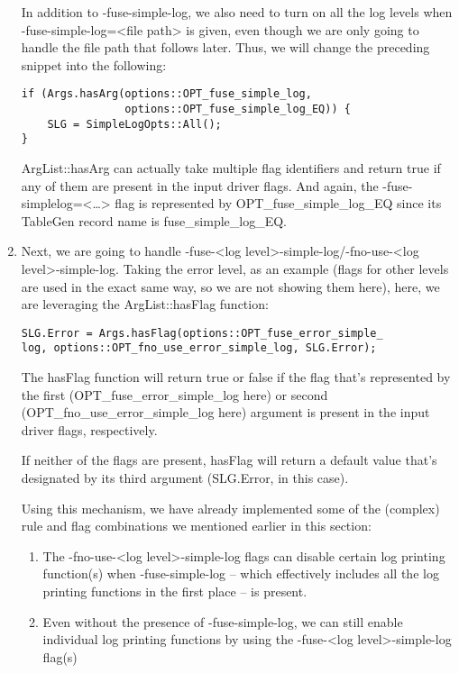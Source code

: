 \begin{enumerate}
In addition to -fuse-simple-log, we also need to turn on all the log levels when -fuse-simple-log=<file path> is given, even though we are only going to handle the file path that follows later. Thus, we will change the preceding snippet into the following:

\begin{lstlisting}[style=styleCXX]
if (Args.hasArg(options::OPT_fuse_simple_log,
                options::OPT_fuse_simple_log_EQ)) {
	SLG = SimpleLogOpts::All();
}
\end{lstlisting}

ArgList::hasArg can actually take multiple flag identifiers and return true if any of them are present in the input driver flags. And again, the -fuse-simplelog=<…> flag is represented by OPT\_fuse\_simple\_log\_EQ since its TableGen record name is fuse\_simple\_log\_EQ.

\item Next, we are going to handle -fuse-<log level>-simple-log/-fno-use-<log level>-simple-log. Taking the error level, as an example (flags for other levels are used in the exact same way, so we are not showing them here), here, we are leveraging the ArgList::hasFlag function:

\begin{lstlisting}[style=styleCXX]
SLG.Error = Args.hasFlag(options::OPT_fuse_error_simple_
log, options::OPT_fno_use_error_simple_log, SLG.Error);
\end{lstlisting}

The hasFlag function will return true or false if the flag that's represented by the first (OPT\_fuse\_error\_simple\_log here) or second (OPT\_fno\_use\_error\_simple\_log here) argument is present in the input driver flags, respectively.

If neither of the flags are present, hasFlag will return a default value that's designated by its third argument (SLG.Error, in this case).

Using this mechanism, we have already implemented some of the (complex) rule and flag combinations we mentioned earlier in this section:

\begin{enumerate}[label=\alph*)]
\item  The -fno-use-<log level>-simple-log flags can disable certain log printing function(s) when -fuse-simple-log – which effectively includes all the log printing functions in the first place – is present.

\item Even without the presence of -fuse-simple-log, we can still enable individual log printing functions by using the -fuse-<log level>-simple-log flag(s)
\end{enumerate}


\end{enumerate}
